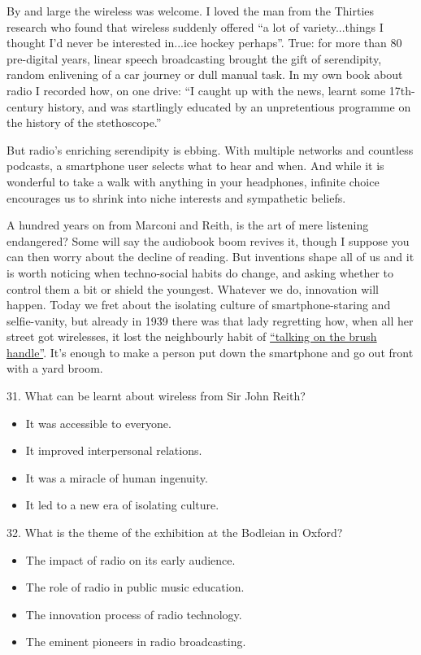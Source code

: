 \documentclass[UTF8,11pt]{ctexart}
\begin{document}
By and large the wireless was welcome. I loved the man from the Thirties research who found that wireless suddenly offered “a lot of variety...things I thought I’d never be interested in...ice hockey perhaps”. True: for more than 80 pre-digital years, linear speech broadcasting brought the gift of serendipity, random enlivening of a car journey or dull manual task. In my own book about radio I recorded how, on one drive: “I caught up with the news, learnt some 17th-century history, and was startlingly educated by an unpretentious programme on the history of the stethoscope.”


But radio’s enriching serendipity is ebbing. With multiple networks and countless podcasts, a smartphone user selects what to hear and when. And while it is wonderful to take a walk with anything in your headphones, infinite choice encourages us to shrink into niche interests and sympathetic beliefs.


A hundred years on from Marconi and Reith, is the art of mere listening endangered? Some will say the audiobook boom revives it, though I suppose you can then worry about the decline of reading. But inventions shape all of us and it is worth noticing when techno-social habits do change, and asking whether to control them a bit or shield the youngest. Whatever we do, innovation will happen. Today we fret about the isolating culture of smartphone-staring and selfie-vanity, but already in 1939 there was that lady regretting how, when all her street got wirelesses, it lost the neighbourly habit of \uline{“talking on the brush handle”}. It’s enough to make a person put down the smartphone and go out front with a yard broom.


31. What can be learnt about wireless from Sir John Reith?


\begin{itemize}[leftmargin=2em,itemsep=.2em,topsep=.4em]\item[A.] It was accessible to everyone.
\item[B.] It improved interpersonal relations.
\item[C.] It was a miracle of human ingenuity.
\item[D.] It led to a new era of isolating culture.
\end{itemize}

32. What is the theme of the exhibition at the Bodleian in Oxford?


\begin{itemize}[leftmargin=2em,itemsep=.2em,topsep=.4em]\item[A.] The impact of radio on its early audience.
\item[B.] The role of radio in public music education.
\item[C.] The innovation process of radio technology.
\item[D.] The eminent pioneers in radio broadcasting.
\end{itemize}
\end{document}
